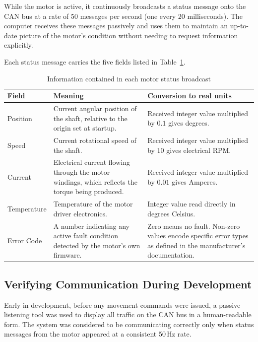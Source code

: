 \documentclass[12pt,a4paper]{article}
\begin{document}
While the motor is active, it continuously broadcasts a status message onto
the CAN bus at a rate of 50 messages per second (one every 20
milliseconds). The computer receives these messages passively and uses them
to maintain an up-to-date picture of the motor's condition without needing
to request information explicitly.

Each status message carries the five fields listed in
Table~\ref{tab:feedback}.

\begin{table}[H]
  \centering
  \caption{Information contained in each motor status broadcast}
  \label{tab:feedback}
  \begin{tabular}{p{3.0cm} p{5.5cm} p{4.2cm}}
    \toprule
    Field & Meaning & Conversion to real units \\
    \midrule
    Position
      & Current angular position of the shaft, relative to the
        origin set at startup.
      & Received integer value multiplied by $0.1$ gives degrees. \\[6pt]
    Speed
      & Current rotational speed of the shaft.
      & Received integer value multiplied by $10$ gives electrical
        RPM. \\[6pt]
    Current
      & Electrical current flowing through the motor windings,
        which reflects the torque being produced.
      & Received integer value multiplied by $0.01$ gives
        Amperes. \\[6pt]
    Temperature
      & Temperature of the motor driver electronics.
      & Integer value read directly in degrees Celsius. \\[6pt]
    Error Code
      & A number indicating any active fault condition detected
        by the motor's own firmware.
      & Zero means no fault. Non-zero values encode specific error
        types as defined in the manufacturer's documentation. \\
    \bottomrule
  \end{tabular}
\end{table}

\subsection{Verifying Communication During Development}

Early in development, before any movement commands were issued, a passive
listening tool was used to display all traffic on the CAN bus in a
human-readable form. The system was considered to be communicating correctly
only when status messages from the motor appeared at a consistent 50\,Hz
rate.
\end{document}
